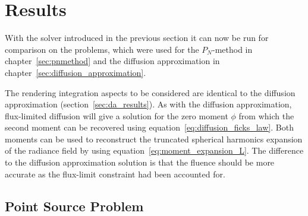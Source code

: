 \section{Results}
\label{sec:fld_results}

With the solver introduced in the previous section it can now be run for comparison on the problems, which were used for the $P_N$-method in chapter~\ref{sec:pnmethod} and the diffusion approximation in chapter~\ref{sec:diffusion_approximation}.

The rendering integration aspects to be considered are identical to the diffusion approximation (section~\ref{sec:da_results}). As with the diffusion approximation, flux-limited diffusion will give a solution for the zero moment $\phi$ from which the second moment can be recovered using equation~\ref{eq:diffusion_ficks_law}. Both moments can be used to reconstruct the truncated spherical harmonics expansion of the radiance field by using equation~\ref{eq:moment_expansion_L}. The difference to the diffusion approximation solution is that the fluence should be more accurate as the flux-limit constraint had been accounted for.

\subsection{Point Source Problem}
\label{sec:pn_results_pointsource}

